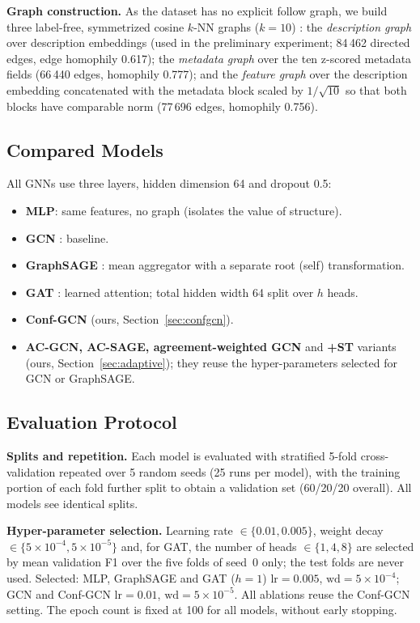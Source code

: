\documentclass{csimq}
\begin{document}
\textbf{Graph construction.} As the dataset has no explicit follow graph, we build three label-free, symmetrized cosine $k$-NN graphs ($k=10$) \cite{zhu2003semi}: the \emph{description graph} over description embeddings (used in the preliminary experiment; 84\,462 directed edges, edge homophily 0.617); the \emph{metadata graph} over the ten z-scored metadata fields (66\,440 edges, homophily 0.777); and the \emph{feature graph} over the description embedding concatenated with the metadata block scaled by $1/\sqrt{10}$ so that both blocks have comparable norm (77\,696 edges, homophily 0.756).

\subsection{Compared Models}
All GNNs use three layers, hidden dimension 64 and dropout 0.5:
\begin{itemize}
\item \textbf{MLP}: same features, no graph (isolates the value of structure).
\item \textbf{GCN} \cite{kipf2017gcn}: baseline.
\item \textbf{GraphSAGE} \cite{hamilton2017sage}: mean aggregator with a separate root (self) transformation.
\item \textbf{GAT} \cite{velickovic2018gat}: learned attention; total hidden width 64 split over $h$ heads.
\item \textbf{Conf-GCN} (ours, Section~\ref{sec:confgcn}).
\item \textbf{AC-GCN, AC-SAGE, agreement-weighted GCN} and \textbf{+ST} variants (ours, Section~\ref{sec:adaptive}); they reuse the hyper-parameters selected for GCN or GraphSAGE.
\end{itemize}

\subsection{Evaluation Protocol}
\label{sec:protocol}
\textbf{Splits and repetition.} Each model is evaluated with stratified 5-fold cross-validation repeated over 5 random seeds (25 runs per model), with the training portion of each fold further split to obtain a validation set (60/20/20 overall). All models see identical splits.

\textbf{Hyper-parameter selection.} Learning rate $\in\{0.01,0.005\}$, weight decay $\in\{5\times10^{-4},5\times10^{-5}\}$ and, for GAT, the number of heads $\in\{1,4,8\}$ are selected by mean validation F1 over the five folds of seed~0 only; the test folds are never used. Selected: MLP, GraphSAGE and GAT ($h=1$) $\mathrm{lr}=0.005$, $\mathrm{wd}=5\times10^{-4}$; GCN and Conf-GCN $\mathrm{lr}=0.01$, $\mathrm{wd}=5\times10^{-5}$. All ablations reuse the Conf-GCN setting. The epoch count is fixed at 100 for all models, without early stopping.
\end{document}
